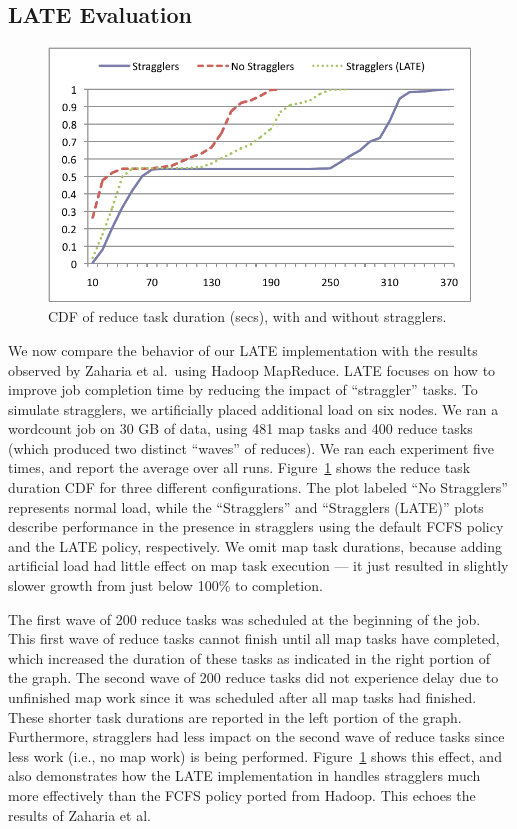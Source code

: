 \subsection{LATE Evaluation}

\begin{figure}
\ssp
  \centering
  \includegraphics{figures/reduce_stragglers}
  \caption{CDF of reduce task duration (secs), with and without stragglers.}
  \label{fig:ec2reduce}
\end{figure}

We now compare the behavior of our LATE implementation with the results observed
by Zaharia et al.\ using Hadoop MapReduce. LATE focuses on how to improve job completion time by reducing the impact of
``straggler'' tasks. To simulate stragglers, we artificially placed additional
load on six nodes. We ran a wordcount job on 30 GB of data, using 481 map tasks
and 400 reduce tasks (which produced two distinct ``waves'' of reduces). We ran
each experiment five times, and report the average over all
runs. Figure~\ref{fig:ec2reduce} shows the reduce task duration CDF for three
different configurations. The plot labeled ``No Stragglers'' represents normal
load, while the ``Stragglers'' and ``Stragglers (LATE)'' plots describe
performance in the presence in stragglers using the default FCFS policy and the
LATE policy, respectively. We omit map task durations, because adding artificial
load had little effect on map task execution --- it just resulted in slightly
slower growth from just below 100\% to completion.

The first wave of 200 reduce tasks was scheduled at the beginning of the
job. This first wave of reduce tasks cannot finish until all map tasks have
completed, which increased the duration of these tasks as indicated in the right
portion of the graph. The second wave of 200 reduce tasks did not experience
delay due to unfinished map work since it was scheduled after all map tasks had
finished. These shorter task durations are reported in the left portion of the
graph. Furthermore, stragglers had less impact on the second wave of reduce
tasks since less work (i.e., no map work) is being
performed. Figure~\ref{fig:ec2reduce} shows this effect, and also demonstrates
how the LATE implementation in {\BOOMA} handles stragglers much more effectively
than the FCFS policy ported from Hadoop.  This echoes the results of Zaharia et
al.~\cite{late-sched}



